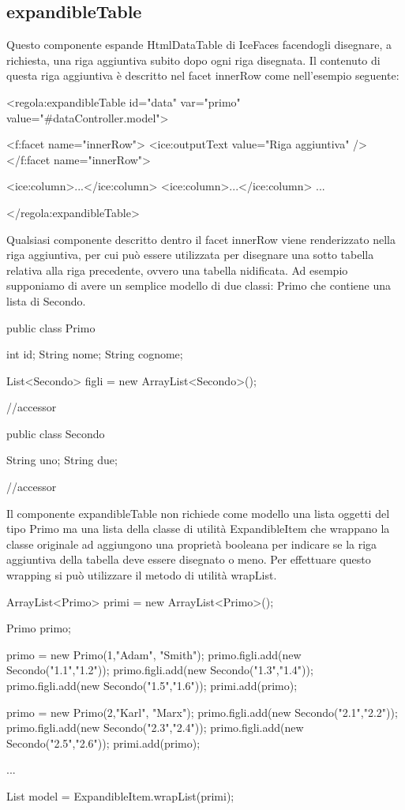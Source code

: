 \subsection{expandibleTable}
Questo componente espande  HtmlDataTable di IceFaces facendogli disegnare, a richiesta, una riga aggiuntiva subito dopo ogni riga disegnata. Il contenuto di questa riga aggiuntiva è descritto nel facet  innerRow come nell'esempio seguente:

\begin{xml}
<regola:expandibleTable id="data" var="primo" value="#{dataController.model}">

  <f:facet name="innerRow">
        <ice:outputText value="Riga aggiuntiva" />
  </f:facet name="innerRow">  

  <ice:column>...</ice:column>
  <ice:column>...</ice:column>
      ...

</regola:expandibleTable>
\end{xml}

Qualsiasi componente descritto dentro il facet innerRow viene renderizzato nella riga aggiuntiva, per cui può essere utilizzata per disegnare una sotto tabella relativa alla riga precedente, ovvero una tabella nidificata. Ad esempio supponiamo di avere un semplice modello di due classi: Primo che contiene una lista di Secondo.

\begin{java}
public class Primo {
  
  int id;
  String nome;
  String cognome;
  
  List<Secondo> figli = new ArrayList<Secondo>();

  //accessor
}

public class Secondo {

  String uno;
  String due;
  
  //accessor
}
\end{java}

Il componente expandibleTable  non richiede come modello una lista oggetti del tipo Primo ma una lista della classe di utilità ExpandibleItem che wrappano la classe originale ad aggiungono una proprietà booleana per indicare se la riga aggiuntiva della tabella deve essere disegnato o meno. Per effettuare questo wrapping si può utilizzare il metodo di utilità wrapList.

\begin{java}
ArrayList<Primo> primi = new ArrayList<Primo>();
    
Primo primo;
    
primo = new Primo(1,"Adam", "Smith");
primo.figli.add(new Secondo("1.1","1.2"));
primo.figli.add(new Secondo("1.3","1.4"));
primo.figli.add(new Secondo("1.5","1.6"));
primi.add(primo);
    
primo = new Primo(2,"Karl", "Marx");
primo.figli.add(new Secondo("2.1","2.2"));
primo.figli.add(new Secondo("2.3","2.4"));
primo.figli.add(new Secondo("2.5","2.6"));
primi.add(primo);

...

List model = ExpandibleItem.wrapList(primi);  
\end{java}

